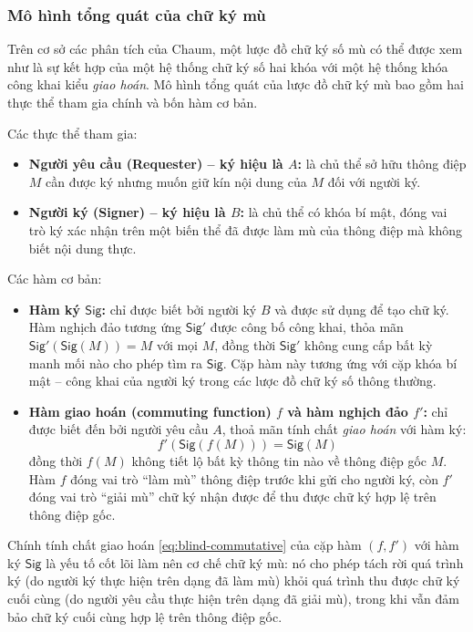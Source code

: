 \subsubsection{Mô hình tổng quát của chữ ký mù}

Trên cơ sở các phân tích của Chaum, một lược đồ chữ ký số mù có thể được xem như là sự kết hợp của một hệ thống chữ ký số hai khóa với một hệ thống khóa công khai kiểu \textit{giao hoán}. Mô hình tổng quát của lược đồ chữ ký mù bao gồm hai thực thể tham gia chính và bốn hàm cơ bản.

Các thực thể tham gia:
\begin{itemize}
    \item \textbf{Người yêu cầu (Requester) -- ký hiệu là $A$:} là chủ thể sở hữu thông điệp $M$ cần được ký nhưng muốn giữ kín nội dung của $M$ đối với người ký.
    \item \textbf{Người ký (Signer) -- ký hiệu là $B$:} là chủ thể có khóa bí mật, đóng vai trò ký xác nhận trên một biến thể đã được làm mù của thông điệp mà không biết nội dung thực.
\end{itemize}

Các hàm cơ bản:
\begin{itemize}
    \item \textbf{Hàm ký $\textsf{Sig}$:} chỉ được biết bởi người ký $B$ và được sử dụng để tạo chữ ký. Hàm nghịch đảo tương ứng $\textsf{Sig}'$ được công bố công khai, thỏa mãn $\textsf{Sig}'(\textsf{Sig}(M)) = M$ với mọi $M$, đồng thời $\textsf{Sig}'$ không cung cấp bất kỳ manh mối nào cho phép tìm ra $\textsf{Sig}$. Cặp hàm này tương ứng với cặp khóa bí mật -- công khai của người ký trong các lược đồ chữ ký số thông thường.
    \item \textbf{Hàm giao hoán (commuting function) $f$ và \textbf{hàm nghịch đảo} $f'$:} chỉ được biết đến bởi người yêu cầu $A$, thoả mãn tính chất \textit{giao hoán} với hàm ký:
    \begin{equation}
        f'(\textsf{Sig}(f(M))) = \textsf{Sig}(M)
        \label{eq:blind-commutative}
    \end{equation}
    đồng thời $f(M)$ không tiết lộ bất kỳ thông tin nào về thông điệp gốc $M$. Hàm $f$ đóng vai trò ``làm mù'' thông điệp trước khi gửi cho người ký, còn $f'$ đóng vai trò ``giải mù'' chữ ký nhận được để thu được chữ ký hợp lệ trên thông điệp gốc.
\end{itemize}

Chính tính chất giao hoán \eqref{eq:blind-commutative} của cặp hàm $(f, f')$ với hàm ký $\textsf{Sig}$ là yếu tố cốt lõi làm nên cơ chế chữ ký mù: nó cho phép tách rời quá trình ký (do người ký thực hiện trên dạng đã làm mù) khỏi quá trình thu được chữ ký cuối cùng (do người yêu cầu thực hiện trên dạng đã giải mù), trong khi vẫn đảm bảo chữ ký cuối cùng hợp lệ trên thông điệp gốc.

